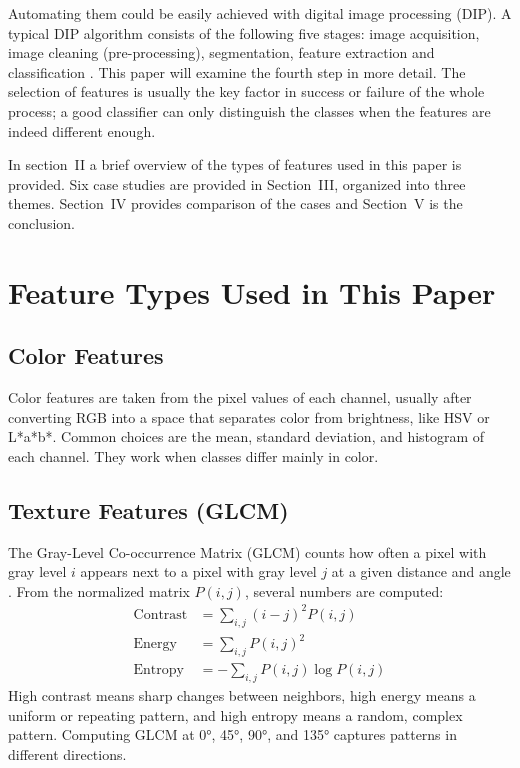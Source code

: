 \documentclass[conference]{IEEEtran}
\begin{document}
    Automating them could be easily achieved with digital image processing (DIP). A typical DIP algorithm consists of the following five stages: image acquisition, image cleaning (pre-processing), segmentation, feature extraction and classification \cite{gonzalez}. This paper will examine the fourth step in more detail. The selection of features is usually the key factor in success or failure of the whole process; a good classifier can only distinguish the classes when the features are indeed different enough.

    In section~II a brief overview of the types of features used in this paper is provided. Six case studies are provided in Section~III, organized into three themes. Section~IV provides comparison of the cases and Section~V is the conclusion.

\section{Feature Types Used in This Paper}
\subsection{Color Features}
Color features are taken from the pixel values of each channel, usually after converting RGB into a space that separates color from brightness, like HSV or L*a*b*. Common choices are the mean, standard deviation, and histogram of each channel. They work when classes differ mainly in color.

\subsection{Texture Features (GLCM)}
The Gray-Level Co-occurrence Matrix (GLCM) counts how often a pixel with gray level $i$ appears next to a pixel with gray level $j$ at a given distance and angle \cite{haralick}. From the normalized matrix $P(i,j)$, several numbers are computed:
\begin{align}
\text{Contrast} &= \textstyle\sum_{i,j}(i-j)^2P(i,j) \\
\text{Energy} &= \textstyle\sum_{i,j}P(i,j)^2 \\
\text{Entropy} &= -\textstyle\sum_{i,j}P(i,j)\log P(i,j)
\end{align}
High contrast means sharp changes between neighbors, high energy means a uniform or repeating pattern, and high entropy means a random, complex pattern. Computing GLCM at 0°, 45°, 90°, and 135° captures patterns in different directions.
\end{document}
